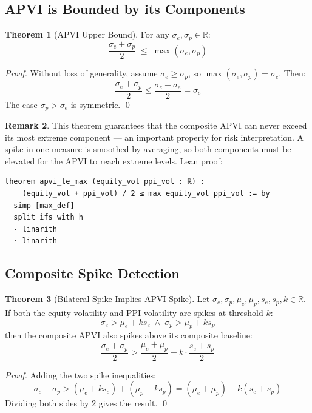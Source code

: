 \documentclass[12pt, a4paper]{article}
\theoremstyle{definition}
\newtheorem{theorem}{Theorem}[section]
\newtheorem{remark}[theorem]{Remark}
\begin{document}
\subsection{APVI is Bounded by its Components}

\begin{theorem}[APVI Upper Bound]
\label{thm:apvi_bound}
For any $\sigma_e, \sigma_p \in \mathbb{R}$:
\[
    \frac{\sigma_e + \sigma_p}{2} \;\leq\; \max(\sigma_e, \sigma_p)
\]
\end{theorem}

\begin{proof}
Without loss of generality, assume $\sigma_e \geq \sigma_p$, so
$\max(\sigma_e, \sigma_p) = \sigma_e$. Then:
\[
    \frac{\sigma_e + \sigma_p}{2} \leq \frac{\sigma_e + \sigma_e}{2} = \sigma_e
\]
The case $\sigma_p > \sigma_e$ is symmetric. \qed
\end{proof}

\begin{remark}
This theorem guarantees that the composite APVI can never exceed its
most extreme component — an important property for risk interpretation.
A spike in one measure is smoothed by averaging, so both components
must be elevated for the APVI to reach extreme levels. Lean proof:
\begin{lstlisting}
theorem apvi_le_max (equity_vol ppi_vol : ℝ) :
    (equity_vol + ppi_vol) / 2 ≤ max equity_vol ppi_vol := by
  simp [max_def]
  split_ifs with h
  · linarith
  · linarith
\end{lstlisting}
\end{remark}

\subsection{Composite Spike Detection}

\begin{theorem}[Bilateral Spike Implies APVI Spike]
\label{thm:apvi_spike}
Let $\sigma_e, \sigma_p, \mu_e, \mu_p, s_e, s_p, k \in \mathbb{R}$.
If both the equity volatility and PPI volatility are spikes at
threshold $k$:
\[
    \sigma_e > \mu_e + k s_e \;\wedge\; \sigma_p > \mu_p + k s_p
\]
then the composite APVI also spikes above its composite baseline:
\[
    \frac{\sigma_e + \sigma_p}{2} > \frac{\mu_e + \mu_p}{2}
    + k\cdot\frac{s_e + s_p}{2}
\]
\end{theorem}

\begin{proof}
Adding the two spike inequalities:
\[
    \sigma_e + \sigma_p > (\mu_e + k s_e) + (\mu_p + k s_p)
    = (\mu_e + \mu_p) + k(s_e + s_p)
\]
Dividing both sides by 2 gives the result. \qed
\end{proof}
\end{document}

